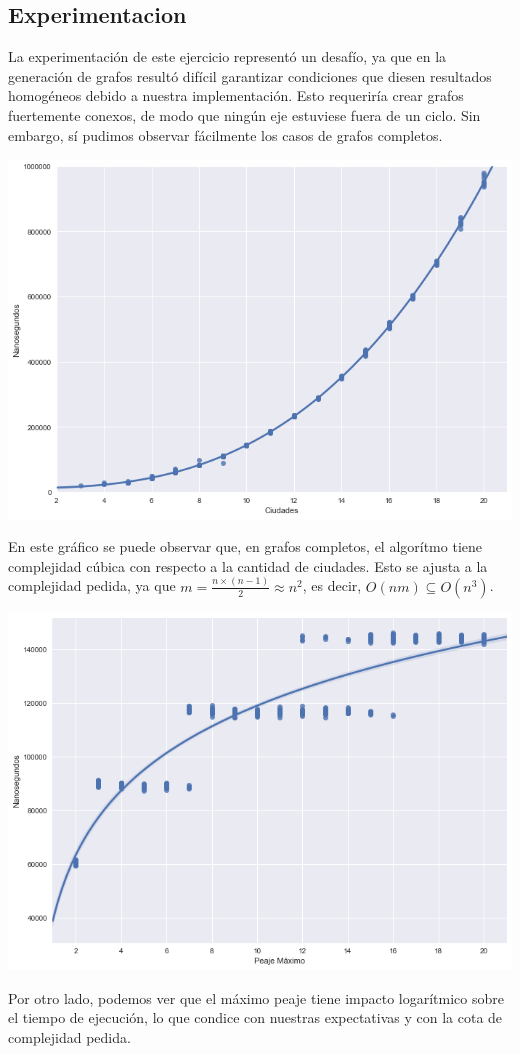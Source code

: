 \subsection{Experimentacion}

La experimentación de este ejercicio representó un desafío, ya que en la generación de grafos resultó difícil garantizar condiciones que diesen resultados homogéneos debido a nuestra implementación. Esto requeriría crear grafos fuertemente conexos, de modo que ningún eje estuviese fuera de un ciclo. Sin embargo, sí pudimos observar fácilmente los casos de grafos completos.

\begin{center}
	\includegraphics[scale=0.5]{imagenes/ej2-1.png}
\end{center}

En este gráfico se puede observar que, en grafos completos, el algorítmo tiene complejidad cúbica con respecto a la cantidad de ciudades. Esto se ajusta a la complejidad pedida, ya que $m = \frac{n \times (n-1)}{2} \approx n^2$, es decir, $O(n m) \subseteq O(n^3)$.

\begin{center}
	\includegraphics[scale=0.5]{imagenes/ej2-2.png}
\end{center}

Por otro lado, podemos ver que el máximo peaje tiene impacto logarítmico sobre el tiempo de ejecución, lo que condice con nuestras expectativas y con la cota de complejidad pedida. 

\pagebreak